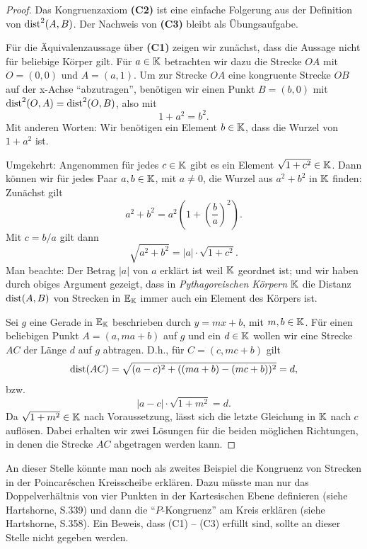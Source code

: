 \begin{proof}
    Das Kongruenzaxiom {\bf (C2)} ist eine einfache Folgerung aus der Definition von $\operatorname{dist}^2(A,B)$.
    Der Nachweis von {\bf (C3)} bleibt als Übungsaufgabe.


    Für die Äquivalenzaussage über {\bf (C1)} zeigen wir zunächst, dass die Aussage nicht für
    beliebige Körper gilt. Für $a\in \mathbb K$ betrachten wir dazu die Strecke $OA$ mit $O = (0,0)$ und $A
    = (a,1)$. Um zur Strecke $OA$ eine kongruente Strecke $OB$ auf der x-Achse "`abzutragen"',
    benötigen wir einen Punkt $B = (b,0)$ mit $\operatorname{dist}^2(O,A) = \operatorname{dist}^2(O,B)$, also mit
    $$
        1 + a^2 = b^2.
    $$
    Mit anderen Worten: Wir benötigen ein Element $b \in \mathbb K$, dass die Wurzel von $1 + a^2$ ist.

    Umgekehrt: Angenommen für jedes $c\in \mathbb K$ gibt es ein Element $\sqrt{1 + c^2} \in \mathbb K$. Dann
    können wir für jedes Paar $a, b \in \mathbb K$, mit $a \not = 0$, die Wurzel aus $a^2 + b^2$ in $\mathbb K$
    finden: Zunächst gilt
    $$
        a^2+b^2 = a^2 \left(1+ \left(\frac{b}{a}\right)^2 \right).
    $$
    Mit $c = b/a$ gilt dann
    $$
        \sqrt{a^2 + b^2} = |a| \cdot \sqrt{1 + c^2}.
    $$
    Man beachte: Der Betrag $|a|$ von $a$ erklärt ist weil $\mathbb K$ geordnet ist; und wir haben durch
    obiges Argument gezeigt, dass in {\em Pythagoreischen Körpern} $\mathbb K$ die Distanz $\operatorname{dist}(A,B)$ von
    Strecken in $\mathbb E_{\mathbb K}$ immer auch ein Element des Körpers ist.

    Sei $g$ eine Gerade in $\mathbb E_{\mathbb K}$ beschrieben durch $y = m x + b$, mit $m, b \in \mathbb K$. Für einen
    beliebigen Punkt $A = (a, m a + b)$ auf $g$ und ein $d \in \mathbb K$ wollen wir eine Strecke $AC$ der
    Länge $d$ auf $g$ abtragen. D.h., für $C = (c, m c + b)$ gilt
    $$
        \operatorname{dist}(AC) = \sqrt{(a - c)^2 + ( (m a + b) - (m c + b) )^2} = d,
    $$
    bzw.
    $$
        |a-c| \cdot \sqrt{1 + m^2} = d.
    $$
    Da $\sqrt{1 + m^2} \in \mathbb K$ nach Voraussetzung, lässt sich die letzte Gleichung in $\mathbb K$ nach $c$
    auflösen. Dabei erhalten wir zwei Lösungen für die beiden möglichen Richtungen, in denen die
    Strecke $AC$ abgetragen werden kann.
\end{proof}

\begin{bem}
    An dieser Stelle könnte man noch als zweites Beispiel die Kongruenz von Strecken in der
    Poincaréschen Kreisscheibe erklären. Dazu müsste man nur das Doppelverhältnis von vier Punkten
    in der Kartesischen Ebene definieren (siehe Hartshorne, S.339) und dann die ``$P$-Kongruenz'' am
    Kreis erklären (siehe Hartshorne, S.358). Ein Beweis, dass (C1) -- (C3) erfüllt sind, sollte an
    dieser Stelle nicht gegeben werden.
\end{bem}

